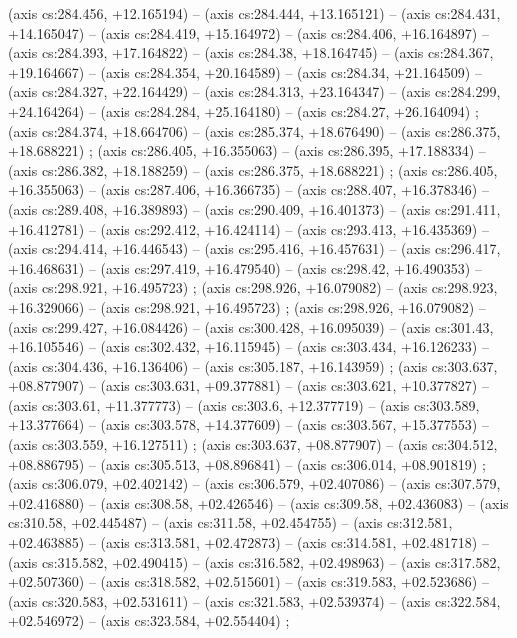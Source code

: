     (axis cs:284.456,    +12.165194) --  (axis cs:284.444,    +13.165121) --  (axis cs:284.431,    +14.165047) --  (axis cs:284.419,    +15.164972) --  (axis cs:284.406,    +16.164897) --  (axis cs:284.393,    +17.164822) --  (axis cs:284.38,    +18.164745) --  (axis cs:284.367,    +19.164667) --  (axis cs:284.354,    +20.164589) --  (axis cs:284.34,    +21.164509) --  (axis cs:284.327,    +22.164429) --  (axis cs:284.313,    +23.164347) --  (axis cs:284.299,    +24.164264) --  (axis cs:284.284,    +25.164180) --  (axis cs:284.27,    +26.164094) ;
    (axis cs:284.374,    +18.664706) --  (axis cs:285.374,    +18.676490) --  (axis cs:286.375,    +18.688221) ;
    (axis cs:286.405,    +16.355063) --  (axis cs:286.395,    +17.188334) --  (axis cs:286.382,    +18.188259) --  (axis cs:286.375,    +18.688221) ;
    (axis cs:286.405,    +16.355063) --  (axis cs:287.406,    +16.366735) --  (axis cs:288.407,    +16.378346) --  (axis cs:289.408,    +16.389893) --  (axis cs:290.409,    +16.401373) --  (axis cs:291.411,    +16.412781) --  (axis cs:292.412,    +16.424114) --  (axis cs:293.413,    +16.435369) --  (axis cs:294.414,    +16.446543) --  (axis cs:295.416,    +16.457631) --  (axis cs:296.417,    +16.468631) --  (axis cs:297.419,    +16.479540) --  (axis cs:298.42,    +16.490353) --  (axis cs:298.921,    +16.495723) ;
    (axis cs:298.926,    +16.079082) --  (axis cs:298.923,    +16.329066) --  (axis cs:298.921,    +16.495723) ;
    (axis cs:298.926,    +16.079082) --  (axis cs:299.427,    +16.084426) --  (axis cs:300.428,    +16.095039) --  (axis cs:301.43,    +16.105546) --  (axis cs:302.432,    +16.115945) --  (axis cs:303.434,    +16.126233) --  (axis cs:304.436,    +16.136406) --  (axis cs:305.187,    +16.143959) ;
    (axis cs:303.637,    +08.877907) --  (axis cs:303.631,    +09.377881) --  (axis cs:303.621,    +10.377827) --  (axis cs:303.61,    +11.377773) --  (axis cs:303.6,    +12.377719) --  (axis cs:303.589,    +13.377664) --  (axis cs:303.578,    +14.377609) --  (axis cs:303.567,    +15.377553) --  (axis cs:303.559,    +16.127511) ;
    (axis cs:303.637,    +08.877907) --  (axis cs:304.512,    +08.886795) --  (axis cs:305.513,    +08.896841) --  (axis cs:306.014,    +08.901819) ;
    (axis cs:306.079,    +02.402142) --  (axis cs:306.579,    +02.407086) --  (axis cs:307.579,    +02.416880) --  (axis cs:308.58,    +02.426546) --  (axis cs:309.58,    +02.436083) --  (axis cs:310.58,    +02.445487) --  (axis cs:311.58,    +02.454755) --  (axis cs:312.581,    +02.463885) --  (axis cs:313.581,    +02.472873) --  (axis cs:314.581,    +02.481718) --  (axis cs:315.582,    +02.490415) --  (axis cs:316.582,    +02.498963) --  (axis cs:317.582,    +02.507360) --  (axis cs:318.582,    +02.515601) --  (axis cs:319.583,    +02.523686) --  (axis cs:320.583,    +02.531611) --  (axis cs:321.583,    +02.539374) --  (axis cs:322.584,    +02.546972) --  (axis cs:323.584,    +02.554404) ;
